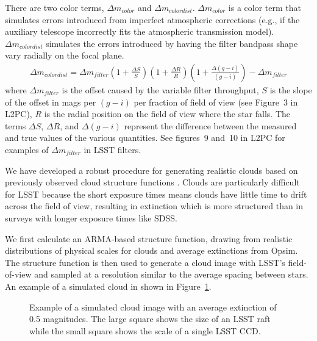 \documentclass[12pt,preprint]{aastex}
\begin{document}

There are two color terms, $\Delta m_{color}$ and $\Delta m_{colordist}$.  $\Delta m_{color}$ is a color term that simulates errors introduced from imperfect atmospheric corrections (e.g., if the auxiliary telescope incorrectly fits the atmospheric transmission model).  $\Delta m_{colordist}$ simulates the errors introduced by having the filter bandpass shape vary radially on the focal plane.  
\begin{eqnarray}
\Delta m_{colordist} = \Delta m_{filter} (1+\frac{\Delta S}{S})(1+\frac{\Delta R}{R})(1+\frac{\Delta (g-i)}{(g-i)})-\Delta m_{filter}
\end{eqnarray}
where $\Delta m_{filter}$ is the offset caused by the variable filter throughput, $S$ is the slope of the offset in mags per $(g-i)$ per fraction of field of view (see Figure~3 in L2PC), $R$ is the radial position on the field of view where the star falls.  The terms $\Delta S$, $\Delta R$, and $\Delta (g-i)$ represent the difference between the measured and true values of the various quantities.  See figures~9 and~10 in L2PC for examples of $\Delta m_{filter}$ in LSST filters.



We have developed a robust procedure for generating realistic clouds based on previously observed cloud structure functions \citep{Ivezic2007,Burke2010}. Clouds are particularly difficult for LSST because the short exposure times means clouds have little time to drift across the field of view, resulting in extinction which is more structured than in surveys with longer exposure times like SDSS.  

We first calculate an ARMA-based structure function, drawing from realistic distributions of physical scales for clouds and average extinctions from Opsim.  The structure function is then used to generate a cloud image with LSST's field-of-view and sampled at a resolution similar to the average spacing between stars.  An example of a simulated cloud in shown in Figure~\ref{fig:cloud}.  


\begin{figure}
\caption{Example of a simulated cloud image with an average extinction of 0.5 magnitudes.  The large square shows the size of an LSST raft while the small square shows the scale of a single LSST CCD.  \label{fig:cloud}}
\end{figure}
\end{document}

